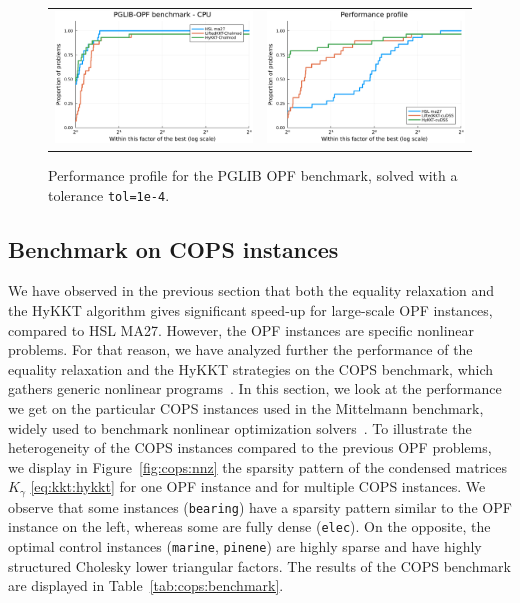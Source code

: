 \begin{figure}[!ht]
  \centering
  \begin{tabular}{cc}
    \includegraphics[width=.4\textwidth]{../figures/pprof-cpu.pdf} &
    \includegraphics[width=.4\textwidth]{../figures/pprof-cuda.pdf}
  \end{tabular}
  \caption{Performance profile for the PGLIB OPF benchmark, solved
    with a tolerance {\tt tol=1e-4}.
  \label{fig:opf:pprof}}
\end{figure}


\subsection{Benchmark on COPS instances}
\label{sec:num:cops}
We have observed in the previous section that both the equality relaxation
and the HyKKT algorithm gives significant speed-up for large-scale
OPF instances, compared to HSL MA27.
However, the OPF instances are specific nonlinear problems.
For that reason, we have analyzed further the performance of
the equality relaxation and the HyKKT strategies on the COPS benchmark,
which gathers generic nonlinear programs~\cite{dolan2004benchmarking}.
In this section, we look at the performance we get on the particular COPS instances used in
the Mittelmann benchmark, widely used to benchmark nonlinear optimization
solvers~\cite{mittelmann2002benchmark}.
To illustrate the heterogeneity of the COPS instances compared to the
previous OPF problems, we display in Figure~\ref{fig:cops:nnz} the sparsity pattern of the
condensed matrices $K_\gamma$ \eqref{eq:kkt:hykkt} for one OPF instance and for multiple
COPS instances. We observe that some instances ({\tt bearing}) have a sparsity pattern
similar to the OPF instance on the left, whereas some are fully dense ({\tt elec}).
On the opposite, the optimal control instances ({\tt marine}, {\tt pinene}) are
highly sparse and have highly structured Cholesky lower triangular factors.
The results of the COPS benchmark are displayed in Table~\ref{tab:cops:benchmark}.

